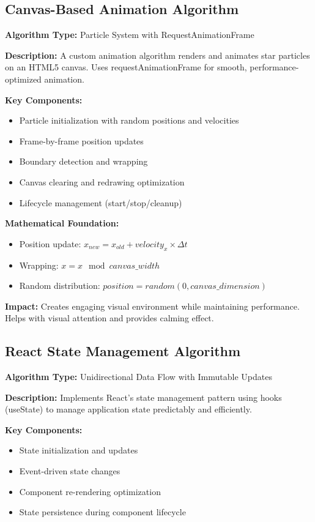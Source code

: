 \documentclass[12pt,a4paper]{article}
\begin{document}
\subsection{Canvas-Based Animation Algorithm}
\textbf{Algorithm Type:} Particle System with RequestAnimationFrame

\textbf{Description:}
A custom animation algorithm renders and animates star particles on an HTML5 canvas. Uses requestAnimationFrame for smooth, performance-optimized animation.

\textbf{Key Components:}
\begin{itemize}
    \item Particle initialization with random positions and velocities
    \item Frame-by-frame position updates
    \item Boundary detection and wrapping
    \item Canvas clearing and redrawing optimization
    \item Lifecycle management (start/stop/cleanup)
\end{itemize}

\textbf{Mathematical Foundation:}
\begin{itemize}
    \item Position update: $x_{new} = x_{old} + velocity_x \times \Delta t$
    \item Wrapping: $x = x \mod canvas\_width$
    \item Random distribution: $position = random(0, canvas\_dimension)$
\end{itemize}

\textbf{Impact:}
Creates engaging visual environment while maintaining performance. Helps with visual attention and provides calming effect.

\subsection{React State Management Algorithm}
\textbf{Algorithm Type:} Unidirectional Data Flow with Immutable Updates

\textbf{Description:}
Implements React's state management pattern using hooks (useState) to manage application state predictably and efficiently.

\textbf{Key Components:}
\begin{itemize}
    \item State initialization and updates
    \item Event-driven state changes
    \item Component re-rendering optimization
    \item State persistence during component lifecycle
\end{itemize}
\end{document}
